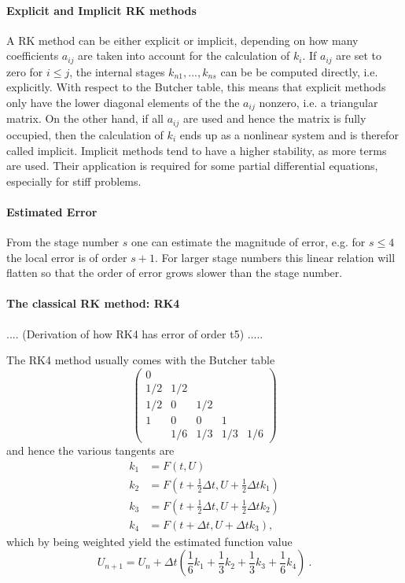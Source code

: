 \paragraph{Explicit and Implicit RK methods}
A RK method can be either explicit or implicit, depending on how many coefficients $a_{ij}$ are taken into account for the calculation of $k_i$.
If $a_{ij}$ are set to zero for $i \leq j$, the internal stages $k_{n1},..., k_{ns}$ can be be computed directly, i.e. explicitly.
With respect to the Butcher table, this means that explicit methods only have the lower diagonal elements of the the $a_{ij}$ nonzero, i.e. a triangular matrix.
On the other hand, if all $a_{ij}$ are used and hence the matrix is fully occupied,
then the calculation of $k_i$ ends up as a nonlinear system and is therefor called implicit. Implicit methods tend to have a higher stability, as more terms are used. Their application is required for some partial differential equations, especially for stiff problems. %


\paragraph{Estimated Error}
From the stage number $s$ one can estimate the magnitude of error, e.g. for $s \leq 4$ the local error is of order $s +1$.
For larger stage numbers this linear relation will flatten so that the order of error grows slower than the stage number.


\paragraph{The classical RK method: RK4}

....
(Derivation of how RK4 has error of order t5)
.....


The RK4 method usually comes with the Butcher table
\begin{equation}
  \begin{pmatrix}
    0 &&&\\
    1/2 & 1/2 & & \\
    1/2 & 0 & 1/2 & \\
    1 & 0 & 0 & 1  \\
    & 1/6 & 1/3 & 1/3 & 1/6
  \end{pmatrix}
\end{equation}
and hence the various tangents are
\begin{align}
  k_1 &= F(t, U) \\
  k_2 &= F(t + \frac{1}{2} \Delta t, U + \frac{1}{2} \Delta t k_1) \\
  k_3 &= F(t + \frac{1}{2} \Delta t, U + \frac{1}{2} \Delta t k_2 ) \\
  k_4 &= F(t + \Delta t, U + \Delta t k_3),
\end{align}
which by being weighted yield the estimated function value
\begin{equation}
  U_{n+1} = U_n + \Delta t \left(\frac{1}{6} k_1 + \frac{1}{3} k_2 + \frac{1}{3} k_3 + \frac{1}{6} k_4 \right)~.
\end{equation}
